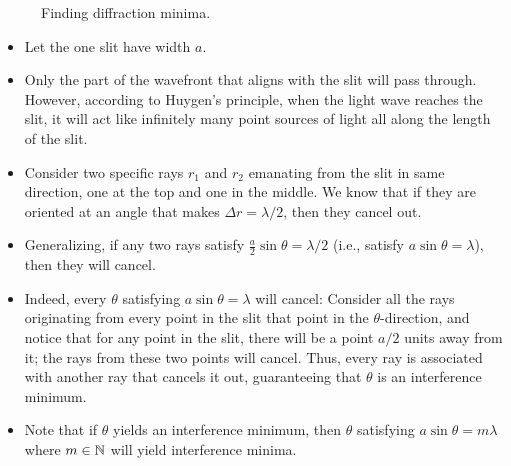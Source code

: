 \documentclass[../notes.tex]{subfiles}
\begin{document}
\begin{itemize}
\begin{figure}[h!]
        \caption{Finding diffraction minima.}
        \label{fig:diffMinima}
    \end{figure}
    \begin{itemize}
        \item Let the one slit have width $a$.
        \item Only the part of the wavefront that aligns with the slit will pass through. However, according to Huygen's principle, when the light wave reaches the slit, it will act like infinitely many point sources of light all along the length of the slit.
        \item Consider two specific rays $r_1$ and $r_2$ emanating from the slit in same direction, one at the top and one in the middle. We know that if they are oriented at an angle that makes $\Delta r=\lambda/2$, then they cancel out.
        \item Generalizing, if any two rays satisfy $\frac{a}{2}\sin\theta=\lambda/2$ (i.e., satisfy $a\sin\theta=\lambda$), then they will cancel.
        \item Indeed, every $\theta$ satisfying $a\sin\theta=\lambda$ will cancel: Consider all the rays originating from every point in the slit that point in the $\theta$-direction, and notice that for any point in the slit, there will be a point $a/2$ units away from it; the rays from these two points will cancel. Thus, every ray is associated with another ray that cancels it out, guaranteeing that $\theta$ is an interference minimum.
        \item Note that if $\theta$ yields an interference minimum, then $\theta$ satisfying $a\sin\theta=m\lambda$ where $m\in\mathbb{N}$ will yield interference minima.
    \end{itemize}
\end{itemize}
\end{document}
